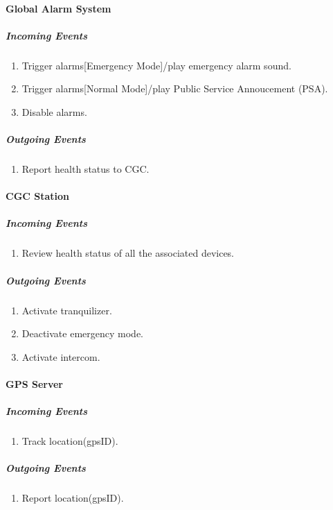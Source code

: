 \documentclass[12pt]{article}
\begin{document}
	\paragraph{Global Alarm System}
	\textit{}
	    \subparagraph{Incoming Events}
		\begin{enumerate}
			\item Trigger alarms[Emergency Mode]/play emergency alarm sound.
			\item Trigger alarms[Normal Mode]/play Public Service Annoucement (PSA).
			\item Disable alarms.
		\end{enumerate}
				
	    \subparagraph{Outgoing Events}
		\begin{enumerate}
			\item Report health status to CGC.
		\end{enumerate}

	\paragraph{CGC Station}
	\textit{}
	    \subparagraph{Incoming Events}
		\begin{enumerate}
			\item Review health status of all the associated devices.
		\end{enumerate}
				
	    \subparagraph{Outgoing Events}
		\begin{enumerate}
			\item Activate tranquilizer.
			\item Deactivate emergency mode.
			\item Activate intercom. 
		\end{enumerate}

	\paragraph{GPS Server}
	\textit{}
	    \subparagraph{Incoming Events}
		\begin{enumerate}
			\item Track location(gpsID).
		\end{enumerate}
				
	    \subparagraph{Outgoing Events}
		\begin{enumerate}
			\item Report location(gpsID).
		\end{enumerate}						
		
\end{document}

